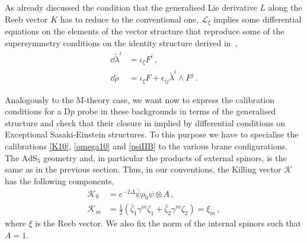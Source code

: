 \documentclass[debug]{phd}
\begin{document}
As already discussed the condition that the generalised Lie derivative $L$ along the Reeb vector $K$ has to reduce to the conventional one, $\mathcal{L}_{\xi}$ implies some differential equations on the elements of the vector structure that reproduce some of the supersymmetry conditions on the identity structure derived in~\cite{Gauntlett:2005ww},
%
	\begin{equation} 
	\label{eq:IIB_ESE_structure_eqs}
		\begin{split}
			\dd  \tilde{\lambda}^i&= \iota_{\xi} F^i\, ,\\
			\dd  \tilde{\rho} &= \iota_{\xi} F +\epsilon_{ij} \tilde{\lambda}^i \wedge F^j\, .
		\end{split}
	\end{equation} 
%
%

Analogously to the M-theory case, we want now to express the calibration conditions for a D$p$ probe in these backgrounds in terms of the generalised structure and check that their closure in implied by differential conditions on Exceptional Sasaki-Einstein structures. To this purpose we have to specialise the calibrations \eqref{K10}, \eqref{omega10} and \eqref{psiIIB} to the various brane configurations.
The $\mathrm{AdS}_5$ geometry and, in particular the products of external spinors, is the same as in the previous section. Thus, in our conventions, the Killing vector $\mathcal{K}$ has the following components,
%
	\begin{equation} 
		\begin{split}
			\mathcal{K}_0 &= e^{-2\Delta} \bar{\psi} \rho_0 \psi \otimes A \, , \\
			\mathcal{K}_m & = \tfrac{1}{2}\left(\bar{\zeta}_1\gamma^m\zeta_1 + \bar{\zeta}_2\gamma^m\zeta_2\right) = \xi_m \, ,
		\end{split}
	\end{equation} 
%
where $\xi$ is the Reeb vector. 
We also fix the norm of the internal spinors such that $A=1$.
\end{document}
